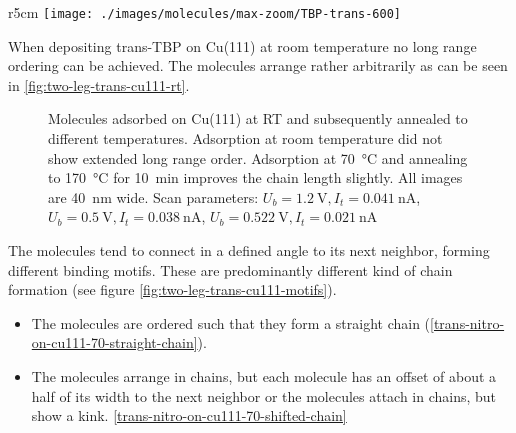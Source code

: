 \begin{wrapfigure}{r}{5cm}\centering
	\texttt{[image: ./images/molecules/max-zoom/TBP-trans-600]}
	\caption{}
\end{wrapfigure}

When depositing trans-TBP on Cu(111) at room temperature no long range ordering can be achieved. The molecules arrange rather arbitrarily as can be seen in  \autoref{fig:two-leg-trans-cu111-rt}.

\begin{figure}[h]
 \centering
\caption{Molecules adsorbed on Cu(111) at RT and subsequently annealed to different temperatures.  Adsorption at room temperature did not show extended long range order.   Adsorption at \SI{70}{\celsius} and  annealing to \SI{170}{\celsius} for \SI{10}{\minute} improves the chain length slightly. All images are \SI{40}{\nano \meter} wide. Scan parameters:  $U_b=\SI{1.2}{\volt}, I_t=\SI{0.041}{\nano \ampere}$,  $U_b=\SI{0.5}{\volt}, I_t=\SI{0.038}{\nano \ampere}$,  $U_b=\SI{0.522}{\volt}, I_t=\SI{0.021}{\nano \ampere}$}
\label{fig:two-leg-trans-cu111}
\end{figure}

The molecules tend to connect in a defined angle to its next neighbor, forming different binding motifs. These are predominantly different kind of chain formation (see figure \ref{fig:two-leg-trans-cu111-motifs}).
\begin{itemize}
 \item The molecules are ordered such that they form a straight chain (\autoref{trans-nitro-on-cu111-70-straight-chain}).
 \item The molecules arrange in chains, but each molecule has an offset of about a half of its width to the next neighbor or the molecules attach in chains, but show a kink. \autoref{trans-nitro-on-cu111-70-shifted-chain}
\end{itemize}

